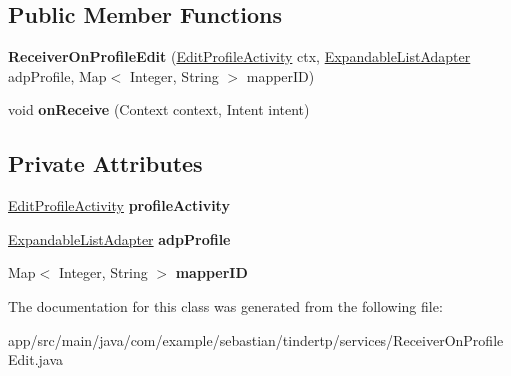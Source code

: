 \subsection*{Public Member Functions}
\begin{DoxyCompactItemize}
\item 
{\bfseries Receiver\+On\+Profile\+Edit} (\hyperlink{classcom_1_1example_1_1sebastian_1_1tindertp_1_1EditProfileActivity}{Edit\+Profile\+Activity} ctx, \hyperlink{classcom_1_1example_1_1sebastian_1_1tindertp_1_1ExpandableListAdapter}{Expandable\+List\+Adapter} adp\+Profile, Map$<$ Integer, String $>$ mapper\+ID)\hypertarget{classcom_1_1example_1_1sebastian_1_1tindertp_1_1services_1_1ReceiverOnProfileEdit_addf3c0ee92f912ac0227fc5437a80c5a}{}\label{classcom_1_1example_1_1sebastian_1_1tindertp_1_1services_1_1ReceiverOnProfileEdit_addf3c0ee92f912ac0227fc5437a80c5a}

\item 
void {\bfseries on\+Receive} (Context context, Intent intent)\hypertarget{classcom_1_1example_1_1sebastian_1_1tindertp_1_1services_1_1ReceiverOnProfileEdit_af526e15648381f6e0aa2ba5e14760c5d}{}\label{classcom_1_1example_1_1sebastian_1_1tindertp_1_1services_1_1ReceiverOnProfileEdit_af526e15648381f6e0aa2ba5e14760c5d}

\end{DoxyCompactItemize}
\subsection*{Private Attributes}
\begin{DoxyCompactItemize}
\item 
\hyperlink{classcom_1_1example_1_1sebastian_1_1tindertp_1_1EditProfileActivity}{Edit\+Profile\+Activity} {\bfseries profile\+Activity}\hypertarget{classcom_1_1example_1_1sebastian_1_1tindertp_1_1services_1_1ReceiverOnProfileEdit_a2528aa8d62a64623894fe0d5cae11151}{}\label{classcom_1_1example_1_1sebastian_1_1tindertp_1_1services_1_1ReceiverOnProfileEdit_a2528aa8d62a64623894fe0d5cae11151}

\item 
\hyperlink{classcom_1_1example_1_1sebastian_1_1tindertp_1_1ExpandableListAdapter}{Expandable\+List\+Adapter} {\bfseries adp\+Profile}\hypertarget{classcom_1_1example_1_1sebastian_1_1tindertp_1_1services_1_1ReceiverOnProfileEdit_a62af02081bd01fe81d04059f3cca4e66}{}\label{classcom_1_1example_1_1sebastian_1_1tindertp_1_1services_1_1ReceiverOnProfileEdit_a62af02081bd01fe81d04059f3cca4e66}

\item 
Map$<$ Integer, String $>$ {\bfseries mapper\+ID}\hypertarget{classcom_1_1example_1_1sebastian_1_1tindertp_1_1services_1_1ReceiverOnProfileEdit_a5a1a7eb3e3ad383dff46ff7971ace2cd}{}\label{classcom_1_1example_1_1sebastian_1_1tindertp_1_1services_1_1ReceiverOnProfileEdit_a5a1a7eb3e3ad383dff46ff7971ace2cd}

\end{DoxyCompactItemize}


The documentation for this class was generated from the following file\+:\begin{DoxyCompactItemize}
\item 
app/src/main/java/com/example/sebastian/tindertp/services/Receiver\+On\+Profile\+Edit.\+java\end{DoxyCompactItemize}
